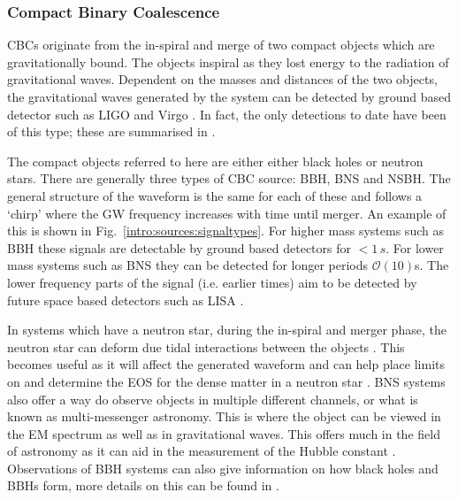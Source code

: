 \subsubsection{\label{sources:transient:cbc} Compact Binary Coalescence}

\glspl{CBC} originate from the in-spiral and merge of two compact objects which are gravitationally bound.
The objects inspiral as they lost energy to the radiation of gravitational waves.
Dependent on the masses and distances of the two objects, the gravitational waves generated by the system can be detected by ground based detector such as LIGO \citep{aasi2015AdvancedLIGO} and Virgo \citep{acernese2015AdvancedVirgo}. 
In fact, the only detections to date have been of this type; these are summarised in \citep{ligoscientificcollaborationandvirgocollaboration2019GWTC1GravitationalWave}.

The compact objects referred to here are either either black holes or neutron stars.
There are generally three types of \gls{CBC} source: \gls{BBH}, \gls{BNS} and \gls{NSBH}.
The general structure of the waveform is the same for each of these and follows a `chirp' where the \gls{GW} frequency increases with time until merger. An example of this is shown in Fig.~\ref{intro:sources:signaltypes}.
For higher mass systems such as \gls{BBH} these signals are detectable by ground based detectors for $< 1\,s$. 
For lower mass systems such as \gls{BNS} they can be detected for longer periods $\mathcal{O}(10)$s. 
The lower frequency parts of the signal (i.e. earlier times) aim to be detected by future space based detectors such as \gls{LISA} \citep{danzmann1996LISALaser}.

In systems which have a neutron star, during the in-spiral and merger phase, the neutron star can deform due tidal interactions between the objects \citep{flanagan2008ConstrainingNeutronstar}. 
This becomes useful as it will affect the generated waveform and can help place limits on and determine the \gls{EOS} for the dense matter in a neutron star \citep{harry2018ObservingMeasuring}. %
\gls{BNS} systems also offer a way do observe objects in multiple different channels, or what is known as multi-messenger astronomy. 
This is where the object can be viewed in the \gls{EM} spectrum as well as in gravitational waves.
This offers much in the field of astronomy as it can aid in the measurement of the Hubble constant \citep{theligoscientificcollaborationandthevirgocollaboration2017GravitationalwaveStandard}. 
Observations of \gls{BBH} systems can also give information on how black holes and \glspl{BBH} form, more details on this can be found in \citep{zevin2017ConstrainingFormation,mandel2018MergingStellarmass}.


